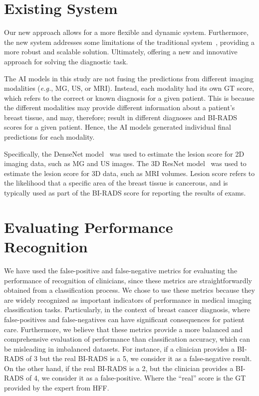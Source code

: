 

\section{Existing System}
\label{sec:app005012}

Our new approach allows for a more flexible and dynamic system.
Furthermore, the new system addresses some limitations of the traditional system~\cite{CALISTO2022102285}, providing a more robust and scalable solution.
Ultimately, offering a new and innovative approach for solving the diagnostic task.

The \ac{AI} models in this study are not fusing the predictions from different imaging modalities ({\it e.g.}, \ac{MG}, \ac{US}, or \ac{MRI}).
Instead, each modality had its own \ac{GT} score, which refers to the correct or known diagnosis for a given patient.
This is because the different modalities may provide different information about a patient's breast tissue, and may, therefore; result in different diagnoses and \ac{BI-RADS} scores for a given patient.
Hence, the \ac{AI} models generated individual final predictions for each modality.

Specifically, the DenseNet model~\cite{8721151} was used to estimate the lesion score for 2D imaging data, such as \ac{MG} and \ac{US} images.
The 3D ResNet model~\cite{Aldoj2020} was used to estimate the lesion score for 3D data, such as \ac{MRI} volumes.
Lesion score refers to the likelihood that a specific area of the breast tissue is cancerous, and is typically used as part of the \ac{BI-RADS} score for reporting the results of exams.

\section{Evaluating Performance Recognition}
\label{sec:app005013}

We have used the false-positive and false-negative metrics for evaluating the performance of recognition of clinicians, since these metrics are straightforwardly obtained from a classification process.
We chose to use these metrics because they are widely recognized as important indicators of performance in medical imaging classification tasks.
Particularly, in the context of breast cancer diagnosis, where false-positives and false-negatives can have significant consequences for patient care.
Furthermore, we believe that these metrics provide a more balanced and comprehensive evaluation of performance than classification accuracy, which can be misleading in imbalanced datasets.
For instance, if a clinician provides a \ac{BI-RADS} of 3 but the real \ac{BI-RADS} is a 5, we consider it as a false-negative result.
On the other hand, if the real \ac{BI-RADS} is a 2, but the clinician provides a \ac{BI-RADS} of 4, we consider it as a false-positive.
Where the ``real'' score is the \ac{GT} provided by the expert from \ac{HFF}.

